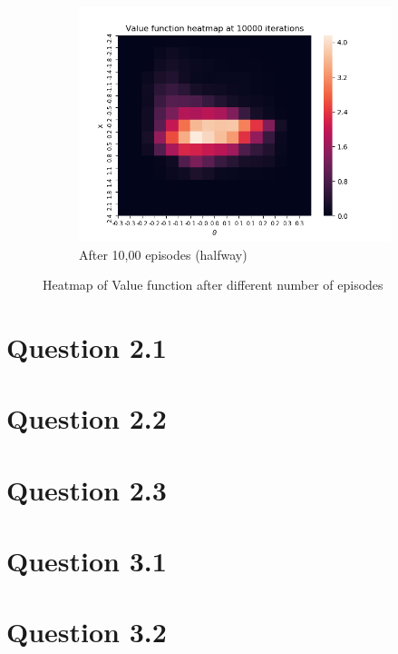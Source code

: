 \documentclass[a4paper]{article}
\begin{document}
\begin{figure}[h!]
    \begin{subfigure}[b]{0.5\textwidth}
        \centering
        \includegraphics[width=\textwidth]{heatmap_10000.png}
        \caption{After 10,00 episodes (halfway)}
    \end{subfigure}
    \caption{Heatmap of Value function after different number of episodes}
    \label{fig-heatmap-diff}
\end{figure}
\section{Question 2.1}
\section{Question 2.2}
\section{Question 2.3}
\section{Question 3.1}
\section{Question 3.2}
\end{document}
